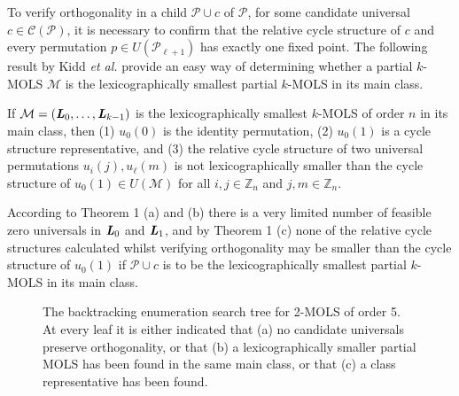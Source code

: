 \documentclass[11pt, a4paper]{article}
\renewcommand{\l}{ \mbox{\bf \emph{L}} }
\newcommand{\m}{\mathcal{ M}}
\newcommand{\p}{\mathcal{P}}
\newcounter{ls}
\begin{document}
To verify orthogonality in a child $ \p \cup c$ of $\p$, for some candidate universal $c \in \mathcal{C}(\p)$, it is necessary to confirm that the relative cycle structure of  $c$ and every permutation $p\in  U(\p_{\ell+1})$ has exactly one fixed point. The following result by Kidd \emph{et al.} \cite[Theorem 4.3.2]{Kidd2012} provide an easy way of determining whether a partial $k$-MOLS  $\m$ is the lexicographically smallest partial $k$-MOLS in its main class.
\begin{theorem}{\cite[Theorem 4.3.2]{Kidd2012} }
If $\m= (\l_0,     \ldots, \l_{k-1})$ is the lexicographically smallest $k$-MOLS of order $n$ in its main class, then (1) $u_0{(0)}$ is the identity permutation, (2) $u_0{(1)}$ is a cycle structure representative, and (3) the relative cycle structure of two universal permutations $u_i{(j)}, u_{\ell}{(m)}$ is not {lexicographically} smaller than the cycle structure of $u_0{(1)}\in U(\m)$ for all $i, j \in \mathbb{Z}_n$ and $j, m\in \mathbb{Z}_n$.
\end{theorem}
According to Theorem 1 (a) and (b) there is a very limited number of feasible zero universals in $\l_0$ and $\l_1$, and by Theorem 1 (c) none of the relative cycle structures calculated whilst verifying orthogonality may be smaller than the cycle structure of $u_0{(1)}$ if $\p \cup c$ is to be the lexicographically smallest partial $k$-MOLS in its main class.
 
 \begin{figure}[b!]
 \centering 
  \begin{sideways}     
            
  \end{sideways}
  
  \vspace*{.4cm} \caption{The backtracking enumeration search tree for 2-MOLS of order 5. At every leaf it is either indicated that (a) no candidate universals preserve orthogonality, or that (b) a lexicographically smaller partial MOLS has been found in the same main class, or  that (c) a class representative has been found.}\label{figtree}
\end{figure}
\end{document}
